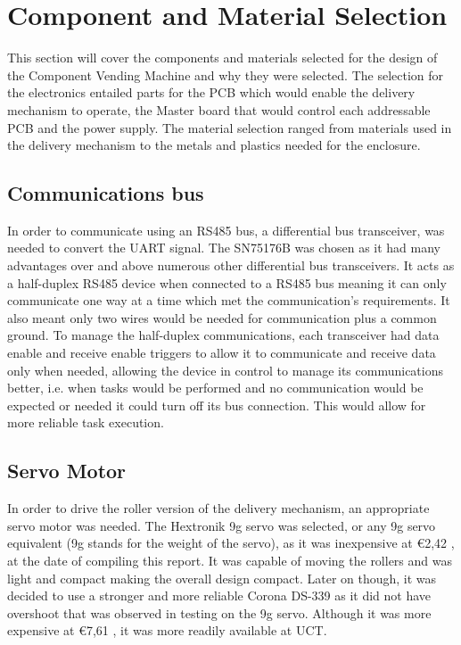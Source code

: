 \documentclass[a4paper,11pt]{article}
\numberwithin{figure}{section}
\numberwithin{table}{section}
\begin{document}
\section{Component and Material Selection}\thispagestyle{sectionstart}
This section will cover the components and materials selected for the design of the Component Vending Machine and why they were selected. The selection for the electronics entailed parts for the PCB which would enable the delivery mechanism to operate, the Master board that would control each addressable PCB and the power supply. The material selection ranged from materials used in the delivery mechanism to the metals and plastics needed for the enclosure.

\subsection{Communications bus}
\label{subsec:bus}
In order to communicate using an RS485 bus, a differential bus transceiver, was needed to convert the UART signal. The SN75176B was chosen as it had many advantages over and above numerous other differential bus transceivers. It acts as a half-duplex RS485 device when connected to a RS485 bus meaning it can only communicate one way at a time which met the communication's requirements. It also meant only two wires would be needed for communication plus a common ground. To manage the half-duplex communications, each transceiver had data enable and receive enable triggers to allow it to communicate and receive data only when needed, allowing the device in control to manage its communications better, i.e. when tasks would be performed and no communication would be expected or needed it could turn off its bus connection. This would allow for more reliable task execution.

\subsection{Servo Motor}
In order to drive the roller version of the delivery mechanism, an appropriate servo motor was needed. The Hextronik 9g servo was selected, or any 9g servo equivalent (9g stands for the weight of the servo), as it was inexpensive at \euro 2,42 \cite{hobbyking}, at the date of compiling this report. It was capable of moving the rollers and was light and compact making the overall design compact. Later on though, it was decided to use a stronger and more reliable Corona DS-339 as it did not have overshoot that was observed in testing on the 9g servo. Although it was more expensive at \euro 7,61 \cite{hobbyking}, it was more readily available at UCT.
\end{document}

